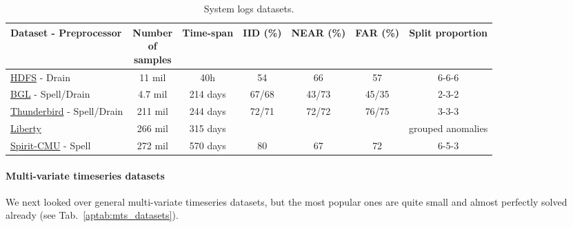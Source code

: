 \documentclass{article}
\begin{document}
\begingroup
\begin{table}[t]
\setlength{\tabcolsep}{4pt} \begin{center}
    \caption{System logs datasets.}
    
    \begin{tabular}{l cc ccc c}
    \toprule
    Dataset - Preprocessor  & \shortstack{Number\\ of\\ samples} & Time-span & IID (\%) & NEAR (\%) & FAR (\%) & Split proportion \\
    \midrule
        \href{https://zenodo.org/record/3227177#.YvZIGuxBwpM}{HDFS}   - Drain &11 mil &  40h       & 54 &  66 & 57 & 6-6-6\\
        \href{https://www.usenix.org/cfdr-data#hpc4}{BGL} -	Spell/Drain & 4.7 mil     &  214 days       & 67/68  &  43/73  & 45/35  &  2-3-2\\
        \href{https://www.usenix.org/cfdr-data#hpc4}{Thunderbird}	-  Spell/Drain  &     211 mil & 244 days        & 72/71  &  72/72  &  76/75  &  3-3-3\\
        \href{https://www.usenix.org/cfdr-data#hpc4}{Liberty}  &  266 mil     & 315 days      &  & & & grouped anomalies\\
        \href{https://www.usenix.org/cfdr-data#hpc4}{Spirit-CMU} - Spell     &  272 mil   & 570 days      & 80 &67& 72& 6-5-3\\
    \bottomrule
    \end{tabular}

    \label{aptab:sys_logs_datasets}
\end{center}
\end{table}
\endgroup

\paragraph{Multi-variate timeseries datasets}
We next looked over general multi-variate timeseries datasets, but the most popular ones are quite small and almost perfectly solved already (see Tab.~\ref{aptab:mts_datasets}).
\end{document}
